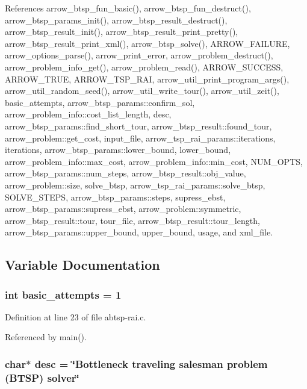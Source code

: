 References arrow\_\-btsp\_\-fun\_\-basic(), arrow\_\-btsp\_\-fun\_\-destruct(), arrow\_\-btsp\_\-params\_\-init(), arrow\_\-btsp\_\-result\_\-destruct(), arrow\_\-btsp\_\-result\_\-init(), arrow\_\-btsp\_\-result\_\-print\_\-pretty(), arrow\_\-btsp\_\-result\_\-print\_\-xml(), arrow\_\-btsp\_\-solve(), ARROW\_\-FAILURE, arrow\_\-options\_\-parse(), arrow\_\-print\_\-error, arrow\_\-problem\_\-destruct(), arrow\_\-problem\_\-info\_\-get(), arrow\_\-problem\_\-read(), ARROW\_\-SUCCESS, ARROW\_\-TRUE, ARROW\_\-TSP\_\-RAI, arrow\_\-util\_\-print\_\-program\_\-args(), arrow\_\-util\_\-random\_\-seed(), arrow\_\-util\_\-write\_\-tour(), arrow\_\-util\_\-zeit(), basic\_\-attempts, arrow\_\-btsp\_\-params::confirm\_\-sol, arrow\_\-problem\_\-info::cost\_\-list\_\-length, desc, arrow\_\-btsp\_\-params::find\_\-short\_\-tour, arrow\_\-btsp\_\-result::found\_\-tour, arrow\_\-problem::get\_\-cost, input\_\-file, arrow\_\-tsp\_\-rai\_\-params::iterations, iterations, arrow\_\-btsp\_\-params::lower\_\-bound, lower\_\-bound, arrow\_\-problem\_\-info::max\_\-cost, arrow\_\-problem\_\-info::min\_\-cost, NUM\_\-OPTS, arrow\_\-btsp\_\-params::num\_\-steps, arrow\_\-btsp\_\-result::obj\_\-value, arrow\_\-problem::size, solve\_\-btsp, arrow\_\-tsp\_\-rai\_\-params::solve\_\-btsp, SOLVE\_\-STEPS, arrow\_\-btsp\_\-params::steps, supress\_\-ebst, arrow\_\-btsp\_\-params::supress\_\-ebst, arrow\_\-problem::symmetric, arrow\_\-btsp\_\-result::tour, tour\_\-file, arrow\_\-btsp\_\-result::tour\_\-length, arrow\_\-btsp\_\-params::upper\_\-bound, upper\_\-bound, usage, and xml\_\-file.

\subsection{Variable Documentation}
\hypertarget{abtsp-rai_8c_227b7ec968925f365b96a92ace419c56}{
\subsubsection[{basic\_\-attempts}]{\setlength{\rightskip}{0pt plus 5cm}int {\bf basic\_\-attempts} = 1}}
\label{abtsp-rai_8c_227b7ec968925f365b96a92ace419c56}




Definition at line 23 of file abtsp-rai.c.

Referenced by main().\hypertarget{abtsp-rai_8c_3aad16fd4bea1b9717f232ea75ad6449}{
\subsubsection[{desc}]{\setlength{\rightskip}{0pt plus 5cm}char$\ast$ {\bf desc} = \char`\"{}Bottleneck traveling salesman problem (BTSP) solver\char`\"{}}}
\label{abtsp-rai_8c_3aad16fd4bea1b9717f232ea75ad6449}




